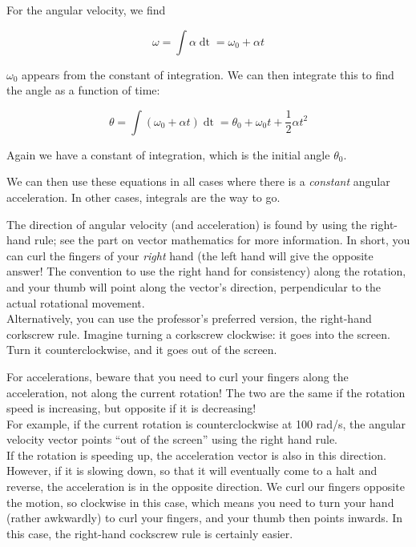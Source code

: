 \documentclass[12pt,a4paper]{report}
\begin{document}
For the angular velocity, we find

\begin{equation}
\omega = \int \alpha \mathop{dt} = \omega_0 + \alpha t
\end{equation}

$\omega_0$ appears from the constant of integration. We can then integrate this to find the angle as a function of time:

\begin{equation}
\theta = \int (\omega_0 + \alpha t) \mathop{dt} = \theta_0 + \omega_0 t + \frac{1}{2} \alpha t^2
\end{equation}

Again we have a constant of integration, which is the initial angle $\theta_0$.

We can then use these equations in all cases where there is a \emph{constant} angular acceleration. In other cases, integrals are the way to go.

The direction of angular velocity (and acceleration) is found by using the right-hand rule; see the part on vector mathematics for more information. In short, you can curl the fingers of your \emph{right} hand (the left hand will give the opposite answer! The convention to use the right hand for consistency) along the rotation, and your thumb will point along the vector's direction, perpendicular to the actual rotational movement.\\
Alternatively, you can use the professor's preferred version, the right-hand corkscrew rule. Imagine turning a corkscrew clockwise: it goes into the screen. Turn it counterclockwise, and it goes out of the screen.

For accelerations, beware that you need to curl your fingers along the acceleration, not along the current rotation! The two are the same if the rotation speed is increasing, but opposite if it is decreasing!\\
For example, if the current rotation is counterclockwise at 100 rad/s, the angular velocity vector points ``out of the screen'' using the right hand rule.\\
If the rotation is speeding up, the acceleration vector is also in this direction.\\
However, if it is slowing down, so that it will eventually come to a halt and reverse, the acceleration is in the opposite direction. We curl our fingers opposite the motion, so clockwise in this case, which means you need to turn your hand (rather awkwardly) to curl your fingers, and your thumb then points inwards. In this case, the right-hand cockscrew rule is certainly easier.
\end{document}
